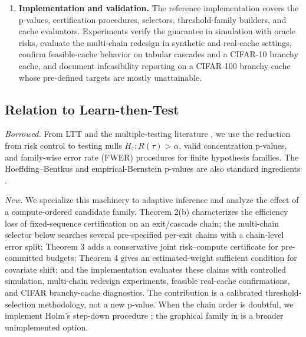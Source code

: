 \documentclass{ieeeaccess}
\begin{document}
\begin{enumerate}
\item \textbf{Implementation and validation.} The reference implementation covers the p-values, certification procedures, selectors, threshold-family builders, and cache evaluators. Experiments verify the guarantee in simulation with oracle risks, evaluate the multi-chain redesign in synthetic and real-cache settings, confirm feasible-cache behavior on tabular cascades and a CIFAR-10 branchy cache, and document infeasibility reporting on a CIFAR-100 branchy cache whose pre-defined targets are mostly unattainable.
\end{enumerate}

\subsection{Relation to Learn-then-Test}

\emph{Borrowed.} From LTT \cite{angelopoulos2025learn} and the multiple-testing literature \cite{holm1979simple,wiens2003fixed,bretz2008graphical}, we use the reduction from risk control to testing nulls $H_\tau:R(\tau)>\alpha$, valid concentration p-values, and family-wise error rate (FWER) procedures for finite hypothesis families. The Hoeffding--Bentkus and empirical-Bernstein p-values are also standard ingredients \cite{hoeffding1963probability,bentkus2004hoeffding,maurer2009empirical}.

\emph{New.} We specialize this machinery to adaptive inference and analyze the effect of a compute-ordered candidate family. Theorem 2(b) characterizes the efficiency loss of fixed-sequence certification on an exit/cascade chain; the multi-chain selector below searches several pre-specified per-exit chains with a chain-level error split; Theorem 3 adds a conservative joint risk--compute certificate for pre-committed budgets; Theorem 4 gives an estimated-weight sufficient condition for covariate shift; and the implementation evaluates these claims with controlled simulation, multi-chain redesign experiments, feasible real-cache confirmations, and CIFAR branchy-cache diagnostics. The contribution is a calibrated threshold-selection methodology, not a new p-value. When the chain order is doubtful, we implement Holm's step-down procedure \cite{holm1979simple}; the graphical family in \cite{bretz2008graphical} is a broader unimplemented option.
\end{document}
